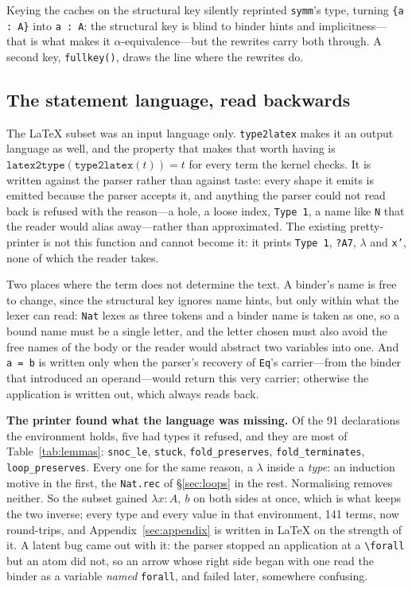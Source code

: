 \documentclass[11pt]{article}
\newcommand{\code}[1]{\texttt{#1}}
\begin{document}
Keying the caches on the structural key silently reprinted \code{symm}'s type, turning
\code{\{a : A\}} into \code{a : A}: the structural key is blind to binder
hints and implicitness---that is what makes it $\alpha$-equivalence---but the
rewrites carry both through. A second key, \code{fullkey()}, draws the line
where the rewrites do.

\subsection{The statement language, read backwards}
\label{sec:roundtrip}

The \LaTeX{} subset was an input language only. \code{type2latex} makes it an
output language as well, and the property that makes that worth having is
$\code{latex2type}(\code{type2latex}(t)) = t$ for every term the kernel
checks. It is written against the parser rather than against taste: every
shape it emits is emitted because the parser accepts it, and anything the
parser could not read back is refused with the reason---a hole, a loose index,
\code{Type 1}, a name like \code{N} that the reader would alias away---rather
than approximated. The existing pretty-printer is not this function and cannot
become it: it prints \code{Type 1}, \code{?A7}, $\lambda$ and \code{x'}, none
of which the reader takes.

Two places where the term does not determine the text. A binder's name is free
to change, since the structural key ignores name hints, but only within what
the lexer can read: \code{Nat} lexes as three tokens and a binder name is
taken as one, so a bound name must be a single letter, and the letter chosen
must also avoid the free names of the body or the reader would abstract two
variables into one. And \code{a = b} is written only when the parser's
recovery of \code{Eq}'s carrier---from the binder that introduced an
operand---would return this very carrier; otherwise the application is written
out, which always reads back.

\textbf{The printer found what the language was missing.} Of the 91
declarations the environment holds, five had types it refused, and they are
most of Table~\ref{tab:lemmas}: \code{snoc\_le}, \code{stuck},
\code{fold\_preserves}, \code{fold\_terminates},
\code{loop\_preserves}. Every one for the same reason, a $\lambda$ inside a
\emph{type}: an induction motive in the first, the \code{Nat.rec} of
\S\ref{sec:loops} in the rest. Normalising removes neither. So the subset gained $\lambda x : A,\ b$ on both sides at
once, which is what keeps the two inverse; every type and every value in that
environment, 141 terms, now round-trips, and
Appendix~\ref{sec:appendix} is written in \LaTeX{} on the strength of it. A
latent bug came out with it: the parser stopped an application at a
\code{\textbackslash forall} but an atom did not, so an arrow whose right side
began with one read the binder as a variable \emph{named} \code{forall}, and
failed later, somewhere confusing.
\end{document}
